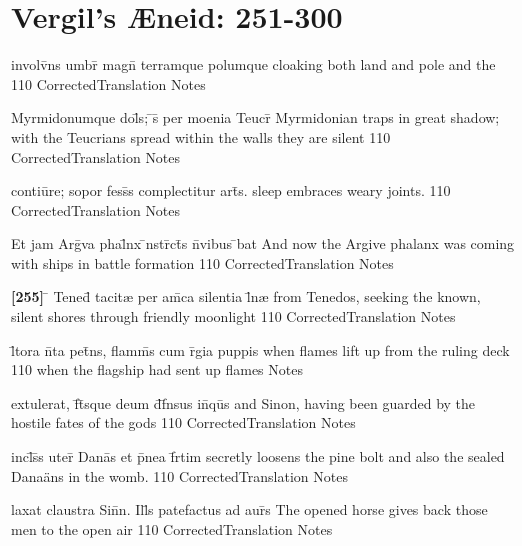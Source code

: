\section{Vergil's {\AE}neid: 251-300} %

\latline
  {involv\={}ns umbr\={} magn\={} terramque polumque}
  { cloaking both land and pole and the }
  {110}
  { CorrectedTranslation }
  { Notes }


\latline
  {Myrmidonumque dol\={}s; \={}s\={\macron {\i}} per moenia Teucr\={\macron {\i}}}
  { Myrmidonian traps in great shadow; with the Teucrians spread within the walls they are silent }
  {110}
  { CorrectedTranslation }
  { Notes }


\latline
  {contiu\={}re; sopor fess\={}s complectitur art\={}s.}
  { sleep embraces weary joints. }
  {110}
  { CorrectedTranslation }
  { Notes }


\latline
  {Et jam Arg\={\macron {\i}}va phal\={}nx \={\macron {\i}}nstr\={}ct\={\macron {\i}}s n\={}vibus \={\macron {\i}}bat}
  { And now the Argive phalanx was coming with ships in battle formation }
  {110}
  { CorrectedTranslation }
  { Notes }


\latline
  {\textbf{[255]} \={} Tened\={} tacit{\ae} per am\={\macron {\i}}ca silentia l\={}n{\ae}}
  { from Tenedos, seeking the known, silent shores through friendly moonlight }
  {110}
  { CorrectedTranslation }
  { Notes }


\latline
  {l\={\macron {\i}}tora n\={}ta pet\={}ns, flamm\={}s cum r\={}gia puppis}
  { when flames lift up from the ruling deck }
  {110}
  { when the flagship had sent up flames }
  { Notes }


\latline
  {extulerat, f\={}t\={\macron {\i}}sque deum d\={}f\={}nsus in\={\macron {\i}}qu\={\macron {\i}}s}
  { and Sinon, having been guarded by the hostile fates of the gods }
  {110}
  { CorrectedTranslation }
  { Notes }


\latline
  {incl\={}s\={}s uter\={} Dana\={}s et p\={\macron {\i}}nea f\={}rtim}
  { secretly loosens the pine bolt and also the sealed Dana\"ans in the womb.  }
  {110}
  { CorrectedTranslation }
  { Notes }


\latline
  {laxat claustra Sin\={}n.  Ill\={}s patefactus ad aur\={}s}
  { The opened horse gives back those men to the open air }
  {110}
  { CorrectedTranslation }
  { Notes }


